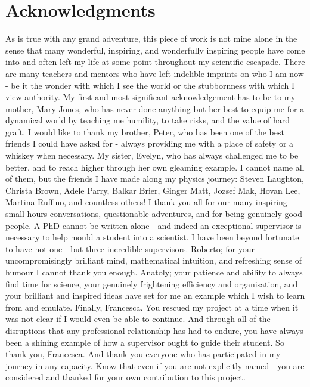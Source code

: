 \chapter*{Acknowledgments}

As is true with any grand adventure, this piece of work is not mine alone in the sense that many wonderful, inspiring, and wonderfully inspiring people have come into and often left my life at some point throughout my scientific escapade. There are many teachers and mentors who have left indelible imprints on who I am now - be it the wonder with which I see the world or the stubbornness with which I view authority. 
%
My first and most significant acknowledgement has to be to my mother, Mary Jones, who has never done anything but her best to equip me for a dynamical world by teaching me humility, to take risks, and the value of hard graft. I would like to thank my brother, Peter, who has been one of the best friends I could have asked for - always providing me with a place of safety or a whiskey when necessary. My sister, Evelyn, who has always challenged me to be better, and to reach higher through her own gleaming example. 
%
I cannot name all of them, but the friends I have made along my physics journey: Steven Laughton, Christa Brown, Adele Parry, Balkar Brier, Ginger Matt, Jozsef Mak, Hovan Lee, Martina Ruffino, and countless others! I thank you all for our many inspiring small-hours conversations, questionable adventures, and for being genuinely good people. 
%
A PhD cannot be written alone - and indeed an exceptional supervisor is necessary to help mould a student into a scientist. I have been beyond fortunate to have not one - but three incredible supervisors. Roberto; for your uncompromisingly brilliant mind, mathematical intuition, and refreshing sense of humour I cannot thank you enough. Anatoly; your patience and ability to always find time for science, your genuinely frightening efficiency and organisation, and your brilliant and inspired ideas have set for me an example which I wish to learn from and emulate. Finally, Francesca. You rescued my project at a time when it was not clear if I would even be able to continue. And through all of the disruptions that any professional relationship has had to endure, you have always been a shining example of how a supervisor ought to guide their student. So thank you, Francesca. 
%
And thank you everyone who has participated in my journey in any capacity. Know that even if you are not explicitly named - you are considered and thanked for your own contribution to this project.